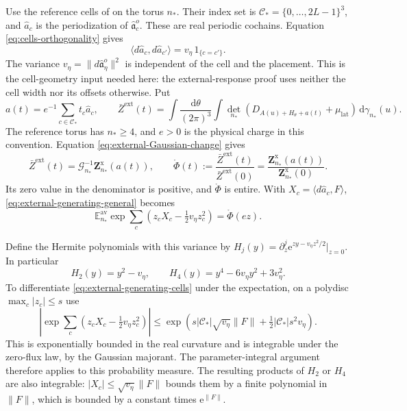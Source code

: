 \documentclass[11pt,letterpaper,reqno]{amsart}
\newcommand{\E}{\mathbb E}
\newcommand{\dd}{\mathrm d}
\begin{document}
Use the reference cells of 
on the torus $n_*$. Their index set is
$\mathcal C_*=\{0,\ldots,2L-1\}^3$, and
$\widehat a_c$ is the periodization of
$\hat{\mathfrak a}_c^o$. These are real periodic cochains.
Equation \eqref{eq:cells-orthogonality} gives
\begin{equation}\label{eq:external-cell-pairing}
 \langle d\widehat a_c,d\widehat a_{c'}\rangle
                         =v_\eta\,1_{\{c=c'\}}.
\end{equation}
The variance $v_\eta=\|d\hat{\mathfrak a}_\eta^o\|^2$
is independent of the cell and the placement.
This is the cell-geometry input needed here:
the external-response proof uses neither the
cell width nor its offsets otherwise. Put
\[
 a(t)=e^{-1}\sum_{c\in\mathcal C_*}t_c\widehat a_c,\qquad
 \bar Z^{\mathrm{ext}}(t)=
     \int\frac{\dd\theta}{(2\pi)^3}
        \int\det_{n_*}(D_{A(u)+H_\theta+a(t)}
                              +\mu_{\mathrm{lat}})\,\dd\gamma_{n_*}(u).
\]
The reference torus has $n_*\ge4$, and $e>0$ is
the physical charge in this convention.
Equation \eqref{eq:external-Gaussian-change} gives
\begin{equation}\label{eq:external-reference-partition}
 \bar Z^{\mathrm{ext}}(t)=
          \mathcal G_{n_*}^{-1}\mathbf Z_{n_*}^{\mathrm{x}}(a(t)),
 \qquad
 \mathring\Phi(t):=\frac{\bar Z^{\mathrm{ext}}(t)}
                           {\bar Z^{\mathrm{ext}}(0)}
        =\frac{\mathbf Z_{n_*}^{\mathrm{x}}(a(t))}
                           {\mathbf Z_{n_*}^{\mathrm{x}}(0)}.
\end{equation}
Its zero value in the denominator is positive,
and $\mathring\Phi$ is entire. With
$X_c=\langle d\widehat a_c,F\rangle$,
\eqref{eq:external-generating-general} becomes
\begin{equation}\label{eq:external-generating-cells}
 \E_{n_*}^{\mathrm{av}}
      \exp\sum_c(z_cX_c-\tfrac12v_\eta z_c^2)
                                      =\mathring\Phi(ez).
\end{equation}

Define the Hermite polynomials with this variance by
$H_j(y)=\partial_z^j \mathrm e^{zy-v_\eta z^2/2}|_{z=0}$.
In particular
\[
 H_2(y)=y^2-v_\eta,\qquad
 H_4(y)=y^4-6v_\eta y^2+3v_\eta^2.
\]
To differentiate \eqref{eq:external-generating-cells}
under the expectation, on a polydisc
$\max_c|z_c|\le s$ use
\[
 \left|\exp\sum_c(z_cX_c-\tfrac12v_\eta z_c^2)\right|
 \le
 \exp\left(s|\mathcal C_*|\sqrt{v_\eta}\|F\|
                       +\tfrac12|\mathcal C_*|s^2v_\eta\right).
\]
This is exponentially bounded in the real curvature
and is integrable under the zero-flux law, by the
Gaussian majorant. The parameter-integral argument
therefore applies to this probability measure.
The resulting products of $H_2$ or $H_4$ are also
integrable: $|X_c|\le\sqrt{v_\eta}\|F\|$ bounds them by a
finite polynomial in $\|F\|$, which is bounded by
a constant times $\mathrm e^{\|F\|}$.
\end{document}
